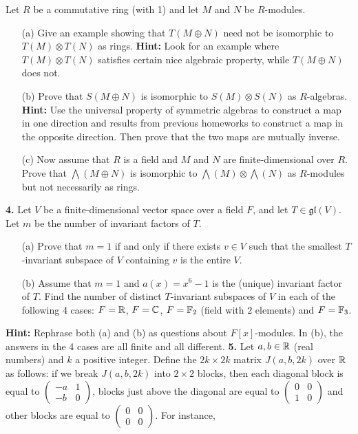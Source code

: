 \documentclass[12pt]{article}
\begin{document}
 Let $R$ be a commutative ring (with 1) and let $M$ and $N$
be $R$-modules.
\begin{itemize}
\item[(a)] Give an example showing that $T(M\oplus N)$ need not be isomorphic
to $T(M)\otimes T(N)$ as rings. {\bf Hint:} Look for an example where
$T(M)\otimes T(N)$ satisfies certain nice algebraic property, while
$T(M\oplus N)$ does not.
\item[(b)] Prove that $S(M\oplus N)$ is isomorphic to $S(M)\otimes S(N)$
as $R$-algebras. {\bf Hint:} Use the universal property of symmetric algebras
to construct a map in one direction and results from previous homeworks 
to construct a map in the opposite direction. Then prove that the two maps
are mutually inverse.
\item[(c)] Now assume that $R$ is a field and $M$ and $N$ are finite-dimensional
over $R$. Prove that $\bigwedge (M\oplus N)$ is isomorphic to
$\bigwedge(M)\otimes \bigwedge(N)$ as $R$-modules but not necessarily
as rings.
\end{itemize}
\skv
{\bf 4.} Let $V$ be a finite-dimensional vector space over a field $F$,
and let $T\in\mathfrak{gl}(V)$. Let $m$ be the number of invariant factors
of $T$.
\begin{itemize}
\item[(a)] Prove that $m=1$ if and only if there exists $v\in V$ such that
the smallest $T$-invariant subspace of $V$ containing $v$ is the entire $V$.
\item[(b)] Assume that $m=1$ and $a(x)=x^6-1$ is the (unique) invariant factor
of $T$. Find the number of distinct $T$-invariant subspaces of $V$
in each of the following 4 cases: $F={\mathbb R}$, $F={\mathbb C}$, $F={\mathbb F}_2$ (field with
$2$ elements) and $F={\mathbb F}_3$. 
 \end{itemize}
{\bf Hint:} Rephrase both (a) and (b) as questions about $F[x]$-modules.
In (b), the answers in the 4 cases are all finite and all different.
\skv
\skv
 {\bf 5.} Let $a,b\in{\mathbb R}$ (real numbers) and $k$ a positive integer. Define
the $2k\times 2k$ matrix $J(a,b,2k)$ over ${\mathbb R}$ as follows: if
we break $J(a,b,2k)$ into $2\times 2$ blocks, then each
diagonal block is equal to $\begin{pmatrix} -a & 1 \\ -b & 0 \end{pmatrix}$,
blocks just above the diagonal are equal to  $\begin{pmatrix} 0 & 0 \\ 1 & 0 \end{pmatrix}$ and other blocks are equal to $\begin{pmatrix} 0 & 0 \\ 0 & 0 \end{pmatrix}.$ For instance,
\end{document}
